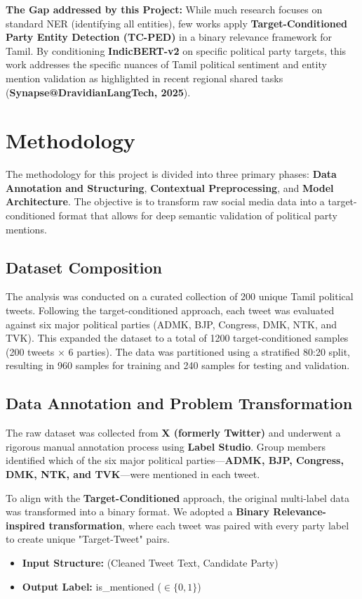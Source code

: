 \documentclass[12pt,a4paper]{article}
\begin{document}
\textbf{The Gap addressed by this Project:} While much research focuses on standard NER (identifying all entities), few works apply \textbf{Target-Conditioned Party Entity Detection (TC-PED)} in a binary relevance framework for Tamil. By conditioning \textbf{IndicBERT-v2} on specific political party targets, this work addresses the specific nuances of Tamil political sentiment and entity mention validation as highlighted in recent regional shared tasks (\textbf{Synapse@DravidianLangTech, 2025}).
\section{Methodology}
The methodology for this project is divided into three primary phases: \textbf{Data Annotation and Structuring}, \textbf{Contextual Preprocessing}, and \textbf{Model Architecture}. The objective is to transform raw social media data into a target-conditioned format that allows for deep semantic validation of political party mentions.

\subsection{Dataset Composition}
The analysis was conducted on a curated collection of 200 unique Tamil political tweets. Following the target-conditioned approach, each tweet was evaluated against six major political parties (ADMK, BJP, Congress, DMK, NTK, and TVK). This expanded the dataset to a total of 1200 target-conditioned samples (200 tweets $\times$ 6 parties). The data was partitioned using a stratified 80:20 split, resulting in 960 samples for training and 240 samples for testing and validation.

\subsection{Data Annotation and Problem Transformation}
The raw dataset was collected from \textbf{X (formerly Twitter)} and underwent a rigorous manual annotation process using \textbf{Label Studio}. Group members identified which of the six major political parties—\textbf{ADMK, BJP, Congress, DMK, NTK, and TVK}—were mentioned in each tweet.

To align with the \textbf{Target-Conditioned} approach, the original multi-label data was transformed into a binary format. We adopted a \textbf{Binary Relevance-inspired transformation}, where each tweet was paired with every party label to create unique "Target-Tweet" pairs. 
\begin{itemize}
    \item \textbf{Input Structure:} (Cleaned Tweet Text, Candidate Party)
    \item \textbf{Output Label:} is\_mentioned ($\in \{0, 1\}$)
\end{itemize}
\end{document}
